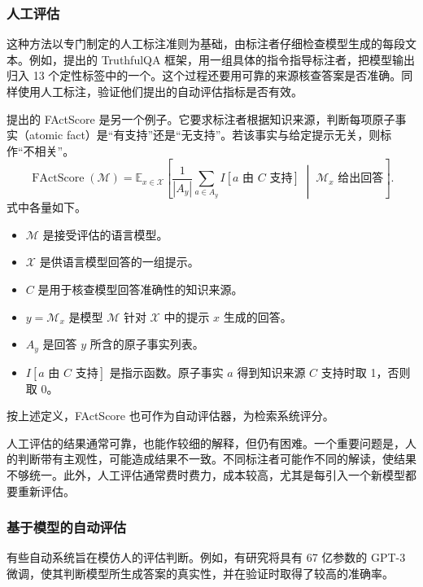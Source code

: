 \subsubsection{人工评估}
这种方法以专门制定的人工标注准则为基础，由标注者仔细检查模型生成的每段文本。例如，提出的 TruthfulQA 框架，用一组具体的指令指导标注者，把模型输出归入 13 个定性标签中的一个。这个过程还要用可靠的来源核查答案是否准确。同样使用人工标注，验证他们提出的自动评估指标是否有效。

提出的 FActScore 是另一个例子。它要求标注者根据知识来源，判断每项原子事实（atomic fact）是“有支持”还是“无支持”。若该事实与给定提示无关，则标作“不相关”。
\begin{equation}
\operatorname{FActScore}(\mathcal{M})
 =\mathbb{E}_{x\in\mathcal{X}}\!\left[
 \frac{1}{|A_y|}\sum_{a\in A_y} I[a\text{ 由 }C\text{ 支持}]
 \;\middle|\; \mathcal{M}_x\text{ 给出回答}
 \right].
\label{eq:ch06-factscore}
\end{equation}
式中各量如下。

\begin{itemize}
\item $\mathcal{M}$ 是接受评估的语言模型。
\item $\mathcal{X}$ 是供语言模型回答的一组提示。
\item $C$ 是用于核查模型回答准确性的知识来源。
\item $y=\mathcal{M}_x$ 是模型 $\mathcal{M}$ 针对 $\mathcal{X}$ 中的提示 $x$ 生成的回答。
\item $A_y$ 是回答 $y$ 所含的原子事实列表。
\item $I[a\text{ 由 }C\text{ 支持}]$ 是指示函数。原子事实 $a$ 得到知识来源 $C$ 支持时取 1，否则取 0。
\end{itemize}

按上述定义，FActScore 也可作为自动评估器，为检索系统评分。

人工评估的结果通常可靠，也能作较细的解释，但仍有困难。一个重要问题是，人的判断带有主观性，可能造成结果不一致。不同标注者可能作不同的解读，使结果不够统一。此外，人工评估通常费时费力，成本较高，尤其是每引入一个新模型都要重新评估。

\subsubsection{基于模型的自动评估}
有些自动系统旨在模仿人的评估判断。例如，有研究将具有 67 亿参数的 GPT-3 微调，使其判断模型所生成答案的真实性，并在验证时取得了较高的准确率。

